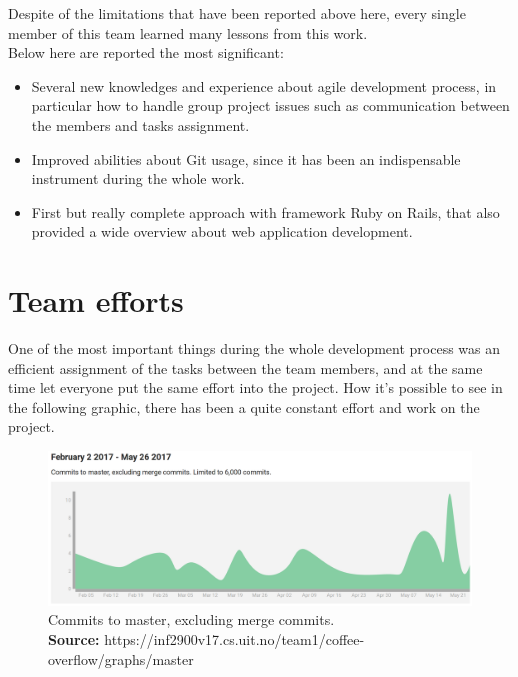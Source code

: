 Despite of the limitations that have been reported above here, every single member of this team learned many lessons from this work. \\
Below here are reported the most significant:
\vspace{-5mm}
\begin{itemize}
\item Several new knowledges and experience about agile development process, in particular how to handle group project issues such as communication between the members and tasks assignment. 
\item Improved abilities about Git usage, since it has been an indispensable instrument during the whole work.
\item First but really complete approach with framework Ruby on Rails, that also provided a wide overview about web application development.
\end{itemize}

\newpage

\section{Team efforts}
\vspace{-5mm}
One of the most important things during the whole development process was an efficient assignment of the tasks between the team members, and at the same time let everyone put the same effort into the project.
How it's possible to see in the following graphic, there has been a quite constant effort and work on the project.

\begin{figure}[H]
	\centering
    \includegraphics[trim={0 0 0 0},clip,width=1\textwidth]{Files/commitsToMaster.png}
    \caption{Commits to master, excluding merge commits.\\ \textbf{Source:} https://inf2900v17.cs.uit.no/team1/coffee-overflow/graphs/master}
    \label{fig: MVC}
\end{figure}

